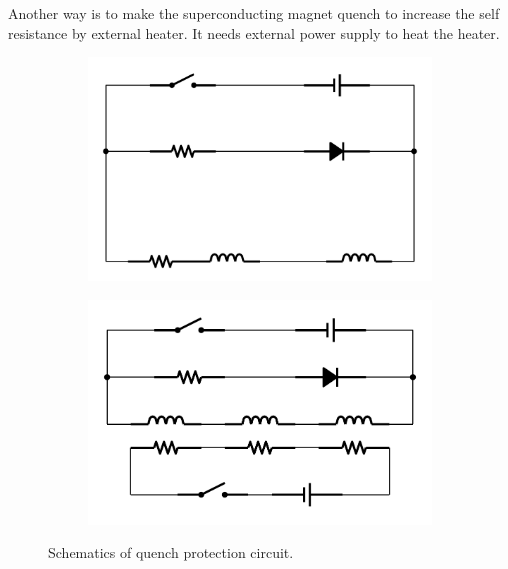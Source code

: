 Another way is to make the superconducting magnet quench to increase the self resistance by external heater.
It needs external power supply to heat the heater.
\begin{figure}[H]
 \begin{subfigure}{0.3\textwidth}
 \centering
 \includegraphics[scale=0.4]{chapter2/fig/dump.pdf}
 \end{subfigure}
 \hspace{0.2\textwidth}
 \begin{subfigure}{0.3\textwidth}
 \centering
 \includegraphics[scale=0.4]{chapter2/fig/heater.pdf}
 \end{subfigure}
 \caption{Schematics of quench protection circuit.}
 \label{dump}
\end{figure}

